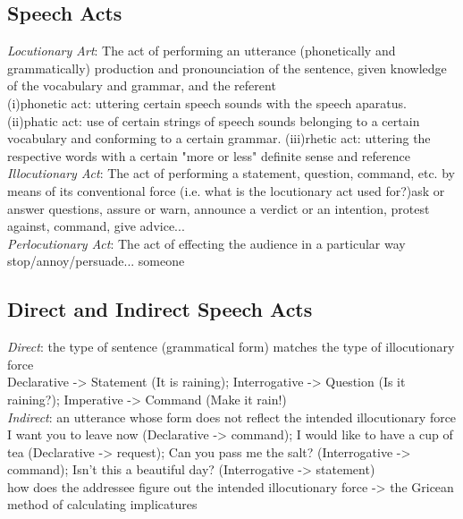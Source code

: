 \subsection*{Speech Acts}
\emph{Locutionary Art}: The act of performing an utterance (phonetically and grammatically) {\tiny production and pronounciation of the sentence, given knowledge of the vocabulary and grammar, and the referent}\\
{\tiny (i)phonetic act: uttering certain speech sounds with the speech aparatus. (ii)phatic act: use of certain strings of speech sounds belonging to a certain vocabulary and conforming to a certain grammar. (iii)rhetic act: uttering the respective words with a certain "more or less" definite sense and reference}\\
\emph{Illocutionary Act}: The act of performing a statement, question, command, etc. by means of its conventional force (i.e. what is the locutionary act used for?){\tiny ask or answer questions, assure or warn, announce a verdict or an intention, protest against, command, give advice...}\\
\emph{Perlocutionary Act}: The act of effecting the audience in a particular way {\tiny stop/annoy/persuade... someone}\\
\subsection*{Direct and Indirect Speech Acts}
\emph{Direct}: the type of sentence (grammatical form) matches the type of illocutionary force\\ {\tiny Declarative -> Statement (It is raining); Interrogative -> Question (Is it raining?); Imperative -> Command (Make it rain!)}\\
\emph{Indirect}: an utterance whose form does not reflect the intended illocutionary force {\tiny I want you to leave now (Declarative -> command); I would like to have a cup of tea (Declarative -> request); Can you pass me the salt? (Interrogative -> command); Isn't this a beautiful day? (Interrogative -> statement)}\\
{\tiny how does the addressee figure out the intended illocutionary force -> the Gricean method of calculating implicatures}